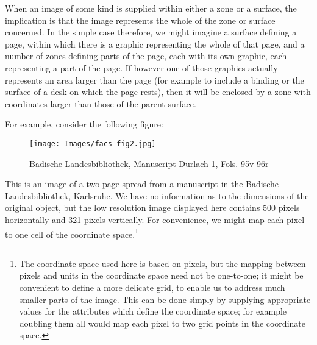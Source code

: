 When an image of some kind is supplied within either a zone or a surface, the implication is that the image represents the whole of the zone or surface concerned. In the simple case therefore, we might imagine a surface defining a page, within which there is a graphic representing the whole of that page, and a number of zones defining parts of the page, each with its own graphic, each representing a part of the page. If however one of those graphics actually represents an area larger than the page (for example to include a binding or the surface of a desk on which the page rests), then it will be enclosed by a zone with coordinates larger than those of the parent surface. \par
For example, consider the following figure: \begin{figure}[htbp]
\noindent\noindent\texttt{[image: Images/facs-fig2.jpg]}
\caption{\label{durlach}Badische Landesbibliothek, Manuscript Durlach 1, Fols. 95v-96r }\end{figure}
 This is an image of a two page spread from a manuscript in the Badische Landesbibliothek, Karlsruhe. We have no information as to the dimensions of the original object, but the low resolution image displayed here contains 500 pixels horizontally and 321 pixels vertically. For convenience, we might map each pixel to one cell of the coordinate space.\footnote{The coordinate space used here is based on pixels, but the mapping between pixels and units in the coordinate space need not be one-to-one; it might be convenient to define a more delicate grid, to enable us to address much smaller parts of the image. This can be done simply by supplying appropriate values for the attributes which define the coordinate space; for example doubling them all would map each pixel to two grid points in the coordinate space.}\par
